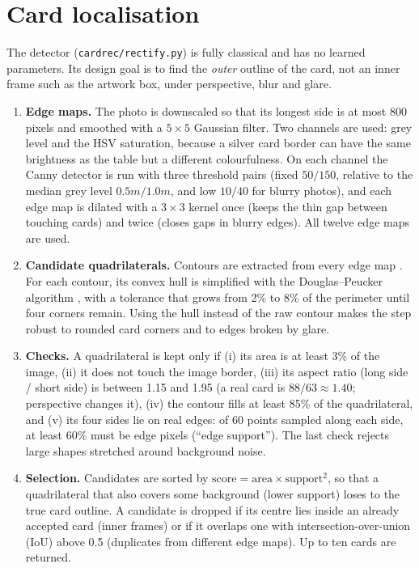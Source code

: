 \section{Card localisation}
\label{sec:localisation}

The detector (\texttt{cardrec/rectify.py}) is fully classical and has no learned parameters. Its design goal is to find the \emph{outer} outline of the card, not an inner frame such as the artwork box, under perspective, blur and glare.

\begin{enumerate}
  \item \textbf{Edge maps.} The photo is downscaled so that its longest side is at most 800 pixels and smoothed with a $5\times5$ Gaussian filter. Two channels are used: grey level and the HSV saturation, because a silver card border can have the same brightness as the table but a different colourfulness. On each channel the Canny detector \citep{canny1986edge} is run with three threshold pairs (fixed $50/150$, relative to the median grey level $0.5m/1.0m$, and low $10/40$ for blurry photos), and each edge map is dilated with a $3\times3$ kernel once (keeps the thin gap between touching cards) and twice (closes gaps in blurry edges). All twelve edge maps are used.
  \item \textbf{Candidate quadrilaterals.} Contours are extracted from every edge map \citep{suzuki1985contours}. For each contour, its convex hull is simplified with the Douglas--Peucker algorithm \citep{douglas1973peucker}, with a tolerance that grows from 2\% to 8\% of the perimeter until four corners remain. Using the hull instead of the raw contour makes the step robust to rounded card corners and to edges broken by glare.
  \item \textbf{Checks.} A quadrilateral is kept only if (i) its area is at least 3\% of the image, (ii) it does not touch the image border, (iii) its aspect ratio (long side / short side) is between 1.15 and 1.95 (a real card is $88/63\approx1.40$; perspective changes it), (iv) the contour fills at least 85\% of the quadrilateral, and (v) its four sides lie on real edges: of 60 points sampled along each side, at least 60\% must be edge pixels (``edge support''). The last check rejects large shapes stretched around background noise.
  \item \textbf{Selection.} Candidates are sorted by $\text{score} = \text{area}\times\text{support}^2$, so that a quadrilateral that also covers some background (lower support) loses to the true card outline. A candidate is dropped if its centre lies inside an already accepted card (inner frames) or if it overlaps one with intersection-over-union (IoU) above 0.5 (duplicates from different edge maps). Up to ten cards are returned.
\end{enumerate}

